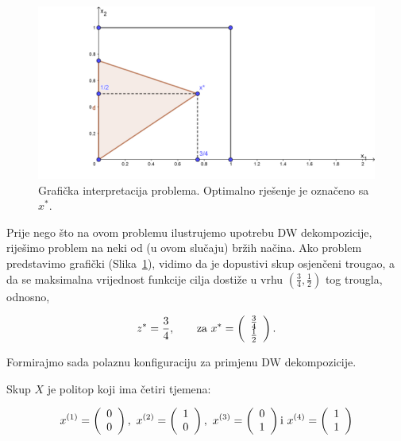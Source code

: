 \documentclass[a4paper, utf8, 11pt, colorlinks]{book}
\theoremstyle{definition}
\begin{document}
 \begin{figure}\label{fig:dw1}
 	
 	\includegraphics[scale=4]{dw2.png}
 	\caption{Grafička interpretacija problema. Optimalno rješenje je označeno sa $x^*$. }
 	\label{fig:dw1}
 \end{figure}
 
 Prije nego što na ovom problemu ilustrujemo upotrebu DW dekompozicije, riješimo problem na neki od (u ovom slučaju) bržih načina. Ako problem predstavimo grafički (Slika~\ref{fig:dw1}), vidimo da je dopustivi skup osjenčeni trougao, a da se maksimalna vrijednost funkcije cilja dostiže u vrhu $(\frac34, 
 \frac12)$ tog trougla, odnosno,

    \begin{equation}
 z^* = \frac 34,\qquad \textnormal{za}\ x^*=\left(\begin{array}{c}
 	\frac34\\
 	\frac12
 \end{array}\right).
 \end{equation}
 
 Formirajmo sada polaznu konfiguraciju za primjenu DW dekompozicije.
 
 Skup $X$ je politop koji ima četiri tjemena:
 
 $$   
 x^{(1)}=\left(\begin{array}{c}
 		0\\
 		0
 	\end{array}\right),\  x^{(2)}=\left(\begin{array}{c}
 	1\\
 	0
 \end{array}\right),\  x^{(3)}=\left(\begin{array}{c}
 0\\
 1
\end{array}\right) \textnormal{i}\ x^{(4)}=\left(\begin{array}{c}
1\\
1
\end{array}\right)
$$
 
\end{document}
